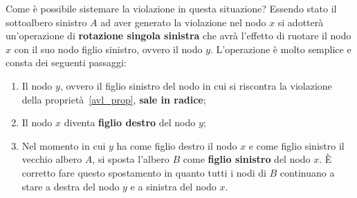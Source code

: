 Come è possibile sistemare la violazione in questa situazione? Essendo stato il sottoalbero sinistro $A$ ad aver generato la violazione nel nodo $x$ si adotterà un'operazione di \textbf{rotazione singola sinistra} che avrà l'effetto di ruotare il nodo $x$ con il suo nodo figlio sinistro, ovvero il nodo $y$. L'operazione è molto semplice e consta dei seguenti passaggi:
\begin{enumerate}
\item Il nodo $y$, ovvero il figlio sinistro del nodo in cui si riscontra la violazione della proprietà~\ref{avl_prop}, \textbf{sale in radice};
\item Il nodo $x$ diventa \textbf{figlio destro} del nodo $y$;
\item Nel momento in cui $y$ ha come figlio destro il nodo $x$ e come figlio sinistro il vecchio albero $A$, si sposta l'albero $B$ come \textbf{figlio sinistro} del nodo $x$. È corretto fare questo spostamento in quanto tutti i nodi di $B$ continuano a stare a destra del nodo $y$ e a sinistra del nodo $x$.
\end{enumerate}

